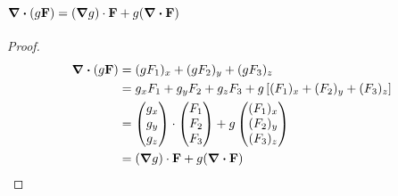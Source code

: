 \documentclass{book}
\begin{document}
\section{$\div{(g\vb{F})} = (\grad g)\cdot \vb{F} + g(\div{\vb{F}})$}
\begin{proof}
    \begin{equation*}
        \begin{split}
            \div{(g\vb{F})} & = (gF_1)_x + (gF_2)_y + (gF_3)_z \\
            & = g_xF_1 + g_y F_2 + g_z F_3 + g\left[(F_1)_x + (F_2)_y + (F_3)_z\right] \\
            & = \begin{pmatrix}
                g_x \\ g_y \\ g_z
            \end{pmatrix} \cdot \begin{pmatrix}
                F_1 \\ F_2 \\ F_3
            \end{pmatrix} + g\begin{pmatrix}
                (F_1)_x \\ (F_2)_y \\ (F_3)_z 
            \end{pmatrix}\\
            & = (\grad g)\cdot \vb{F} + g(\div{\vb{F}})
        \end{split}
    \end{equation*}
\end{proof}
\end{document}
